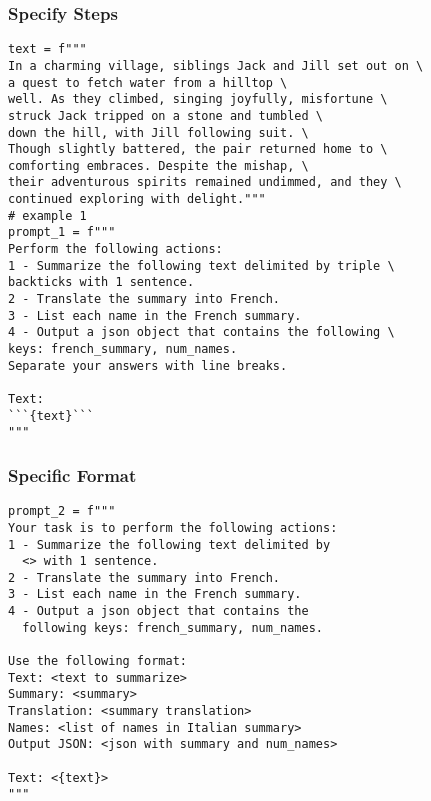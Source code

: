 \begin{frame}[fragile]\frametitle{Specify Steps}

{\tiny
\begin{lstlisting}
text = f"""
In a charming village, siblings Jack and Jill set out on \ 
a quest to fetch water from a hilltop \ 
well. As they climbed, singing joyfully, misfortune \ 
struck Jack tripped on a stone and tumbled \ 
down the hill, with Jill following suit. \ 
Though slightly battered, the pair returned home to \ 
comforting embraces. Despite the mishap, \ 
their adventurous spirits remained undimmed, and they \ 
continued exploring with delight."""
# example 1
prompt_1 = f"""
Perform the following actions: 
1 - Summarize the following text delimited by triple \
backticks with 1 sentence.
2 - Translate the summary into French.
3 - List each name in the French summary.
4 - Output a json object that contains the following \
keys: french_summary, num_names.
Separate your answers with line breaks.

Text:
```{text}```
"""
\end{lstlisting}

}	
		
\end{frame}

\begin{frame}[fragile]\frametitle{Specific Format}

\begin{lstlisting}
prompt_2 = f"""
Your task is to perform the following actions: 
1 - Summarize the following text delimited by 
  <> with 1 sentence.
2 - Translate the summary into French.
3 - List each name in the French summary.
4 - Output a json object that contains the 
  following keys: french_summary, num_names.

Use the following format:
Text: <text to summarize>
Summary: <summary>
Translation: <summary translation>
Names: <list of names in Italian summary>
Output JSON: <json with summary and num_names>

Text: <{text}>
"""
\end{lstlisting}
\end{frame}


